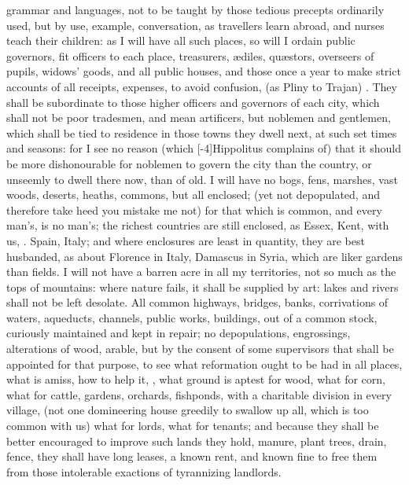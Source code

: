 {grammar and languages, not to be taught by those tedious precepts
ordinarily used, but by use, example, conversation, as travellers
learn abroad, and nurses teach their children: as I will have all such
places, so will I ordain public governors, fit officers to each
place, treasurers, \ae{}diles, qu\ae{}stors, overseers of pupils, widows'
goods, and all public houses, \etc{} and those once a year to make strict
accounts of all receipts, expenses, to avoid confusion,  (as Pliny to Trajan) . They shall be
subordinate to those higher officers and governors of each city, which
shall not be poor tradesmen, and mean artificers, but noblemen and
gentlemen, which shall be tied to residence in those towns they dwell
next, at such set times and seasons: for I see no reason (which
[-4\baselineskip]Hippolitus complains of) that it should be more dishonourable for
noblemen to govern the city than the country, or unseemly to dwell
there now, than of old. I will have no bogs, fens, marshes, vast
woods, deserts, heaths, commons, but all enclosed; (yet not
depopulated, and therefore take heed you mistake me not) for that which
is common, and every man's, is no man's; the richest countries are
still enclosed, as Essex, Kent, with us, \etc{}. Spain, Italy; and where
enclosures are least in quantity, they are best husbanded, as
about Florence in Italy, Damascus in Syria, \etc{} which are liker gardens
than fields. I will not have a barren acre in all my territories, not
so much as the tops of mountains: where nature fails, it shall be
supplied by art: lakes and rivers shall not be left desolate. All
common highways, bridges, banks, corrivations of waters, aqueducts,
channels, public works, buildings, \etc{} out of a common stock,
curiously maintained and kept in repair; no depopulations, engrossings,
alterations of wood, arable, but by the consent of some supervisors
that shall be appointed for that purpose, to see what reformation ought
to be had in all places, what is amiss, how to help it, , what ground is aptest for wood,
what for corn, what for cattle, gardens, orchards, fishponds, \etc{} with
a charitable division in every village, (not one domineering house
greedily to swallow up all, which is too common with us) what for
lords, what for tenants; and because they shall be better
encouraged to improve such lands they hold, manure, plant trees, drain,
fence, \etc{} they shall have long leases, a known rent, and known fine to
free them from those intolerable exactions of tyrannizing landlords.

}
